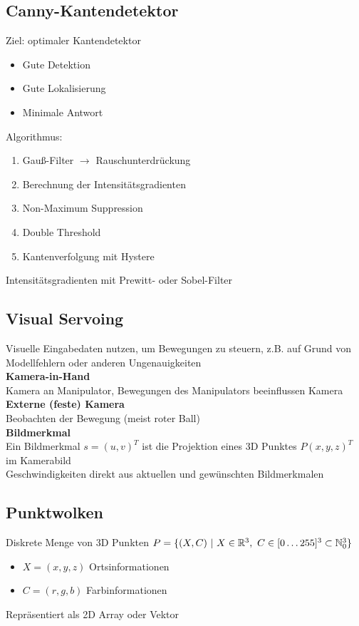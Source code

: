 \subsection{Canny-Kantendetektor}
Ziel: optimaler Kantendetektor
\begin{itemize}
\item Gute Detektion
\item Gute Lokalisierung
\item Minimale Antwort
\end{itemize}

Algorithmus:
\begin{enumerate}
\item Gauß-Filter \(\rightarrow\) Rauschunterdrückung
\item Berechnung der Intensitätsgradienten
\item Non-Maximum Suppression
\item Double Threshold
\item Kantenverfolgung mit Hystere
\end{enumerate}

Intensitätsgradienten mit Prewitt- oder Sobel-Filter


\subsection{Visual Servoing}
Visuelle Eingabedaten nutzen, um Bewegungen zu steuern, z.B. auf Grund von Modellfehlern oder anderen Ungenauigkeiten\\

\textbf{Kamera-in-Hand}\\
Kamera an Manipulator, Bewegungen des Manipulators beeinflussen Kamera\\

\textbf{Externe (feste) Kamera}\\
Beobachten der Bewegung (meist roter Ball)\\

\textbf{Bildmerkmal}\\
Ein Bildmerkmal \(s = (u,v)^T\) ist die Projektion eines 3D Punktes \(P (x, y, z)^T\) im Kamerabild\\
Geschwindigkeiten direkt aus aktuellen und gewünschten Bildmerkmalen\\



\subsection{Punktwolken}
Diskrete Menge von 3D Punkten \(P = \{(X, C)\ |\ X \in \mathbb{R}^3,\ C \in [0 \ldots 255]^3 \subset \mathbb{N}^3_0\}\)
\begin{itemize}
\item \(X = (x, y, z)\) Ortsinformationen
\item \(C = (r, g, b)\) Farbinformationen
\end{itemize}
Repräsentiert als 2D Array oder Vektor\\

